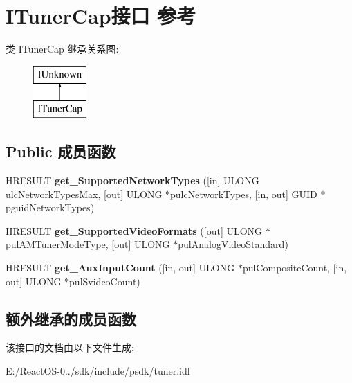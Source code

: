 \hypertarget{interface_i_tuner_cap}{}\section{I\+Tuner\+Cap接口 参考}
\label{interface_i_tuner_cap}
类 I\+Tuner\+Cap 继承关系图\+:\begin{figure}[H]
\begin{center}
\leavevmode
\includegraphics[height=2.000000cm]{interface_i_tuner_cap}
\end{center}
\end{figure}
\subsection*{Public 成员函数}
\begin{DoxyCompactItemize}
\item 
\mbox{\label{interface_i_tuner_cap_ab7c80d1fd015144d432202ebfad027da}} 
H\+R\+E\+S\+U\+LT {\bfseries get\+\_\+\+Supported\+Network\+Types} (\mbox{[}in\mbox{]} U\+L\+O\+NG ulc\+Network\+Types\+Max, \mbox{[}out\mbox{]} U\+L\+O\+NG $\ast$pulc\+Network\+Types, \mbox{[}in, out\mbox{]} \hyperlink{interface_g_u_i_d}{G\+U\+ID} $\ast$pguid\+Network\+Types)
\item 
\mbox{\label{interface_i_tuner_cap_a6ba3919c5d2ad389882d5867806c7757}} 
H\+R\+E\+S\+U\+LT {\bfseries get\+\_\+\+Supported\+Video\+Formats} (\mbox{[}out\mbox{]} U\+L\+O\+NG $\ast$pul\+A\+M\+Tuner\+Mode\+Type, \mbox{[}out\mbox{]} U\+L\+O\+NG $\ast$pul\+Analog\+Video\+Standard)
\item 
\mbox{\label{interface_i_tuner_cap_ab26c1edbe8a3a613717c42b493d5b761}} 
H\+R\+E\+S\+U\+LT {\bfseries get\+\_\+\+Aux\+Input\+Count} (\mbox{[}in, out\mbox{]} U\+L\+O\+NG $\ast$pul\+Composite\+Count, \mbox{[}in, out\mbox{]} U\+L\+O\+NG $\ast$pul\+Svideo\+Count)
\end{DoxyCompactItemize}
\subsection*{额外继承的成员函数}


该接口的文档由以下文件生成\+:\begin{DoxyCompactItemize}
\item 
E\+:/\+React\+O\+S-\/0../sdk/include/psdk/tuner.\+idl\end{DoxyCompactItemize}
